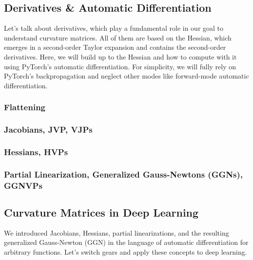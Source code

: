 \subsection{Derivatives \& Automatic Differentiation}\label{subsec:derivatives}
Let's talk about derivatives, which play a fundamental role in our goal to understand curvature matrices.
All of them are based on the Hessian, which emerges in a second-order Taylor expansion and contains the second-order derivatives.
Here, we will build up to the Hessian and how to compute with it using PyTorch's automatic differentiation.
For simplicity, we will fully rely on PyTorch's backpropagation and neglect other modes like forward-mode automatic differentiation.

\switchcolumn[0]
\subsubsection{Flattening}


\switchcolumn[0]
\subsubsection{Jacobians, JVP, VJPs}


\switchcolumn[0]
\subsubsection{Hessians, HVPs}


\switchcolumn[0]
\subsubsection{Partial Linearization, Generalized Gauss-Newtons (GGNs), GGNVPs}\label{sec:partial_linearization}


\switchcolumn[0]
\subsection{Curvature Matrices in Deep Learning}\label{subsec:curvature-matrices}

We introduced Jacobians, Hessians, partial linearizations, and the resulting generalized Gauss-Newton (GGN) in the language of automatic differentiation for arbitrary functions.
Let's switch gears and apply these concepts to deep learning.

